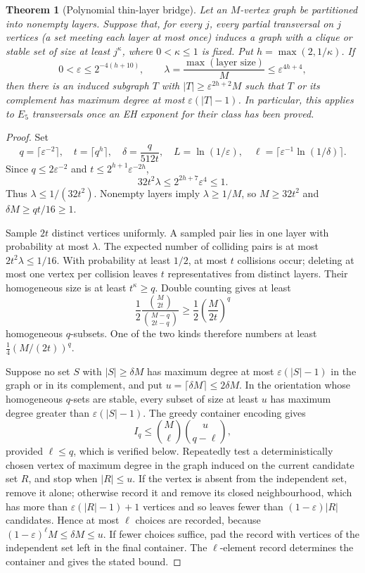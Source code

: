 \documentclass[11pt,a4paper]{article}
\newtheorem{theorem}{Theorem}[section]
\theoremstyle{definition}
\theoremstyle{remark}
\numberwithin{equation}{section}
\begin{document}
\begin{theorem}[Polynomial thin-layer bridge]
Let an \(M\)-vertex graph be partitioned into nonempty layers. Suppose that, for every \(j\), every partial transversal on \(j\) vertices (a set meeting each layer at most once) induces a graph with a clique or stable set of size at least \(j^\kappa\), where \(0<\kappa\le1\) is fixed. Put \(h=\max(2,1/\kappa)\). If
\[
 0<\varepsilon\le2^{-4(h+10)},\qquad
 \lambda=\frac{\max(\text{layer size})}{M}\le\varepsilon^{4h+4},
\]
then there is an induced subgraph \(T\) with \(|T|\ge\varepsilon^{2h+2}M\) such that \(T\) or its complement has maximum degree at most \(\varepsilon(|T|-1)\). In particular, this applies to \(E_5\) transversals once an EH exponent for their class has been proved.
\end{theorem}
\begin{proof}
Set
\[
 q=\lceil\varepsilon^{-2}\rceil,\quad t=\lceil q^h\rceil,\quad
 \delta=\frac{q}{512t},\quad L=\ln(1/\varepsilon),\quad
 \ell=\lceil\varepsilon^{-1}\ln(1/\delta)\rceil.
\]
Since \(q\le2\varepsilon^{-2}\) and \(t\le2^{h+1}\varepsilon^{-2h}\),
\[
 32t^2\lambda\le2^{2h+7}\varepsilon^4\le1.
\]
Thus \(\lambda\le1/(32t^2)\). Nonempty layers imply \(\lambda\ge1/M\), so \(M\ge32t^2\) and \(\delta M\ge qt/16\ge1\).

Sample \(2t\) distinct vertices uniformly. A sampled pair lies in one layer with probability at most \(\lambda\). The expected number of colliding pairs is at most \(2t^2\lambda\le1/16\). With probability at least \(1/2\), at most \(t\) collisions occur; deleting at most one vertex per collision leaves \(t\) representatives from distinct layers. Their homogeneous size is at least \(t^\kappa\ge q\). Double counting gives at least
\[
 \frac12\frac{\binom{M}{2t}}{\binom{M-q}{2t-q}}
 \ge\frac12\left(\frac{M}{2t}\right)^q
\]
homogeneous \(q\)-subsets. One of the two kinds therefore numbers at least \(\tfrac14(M/(2t))^q\).

Suppose no set \(S\) with \(|S|\ge\delta M\) has maximum degree at most \(\varepsilon(|S|-1)\) in the graph or in its complement, and put \(u=\lceil\delta M\rceil\le2\delta M\). In the orientation whose homogeneous \(q\)-sets are stable, every subset of size at least \(u\) has maximum degree greater than \(\varepsilon(|S|-1)\). The greedy container encoding gives
\[
 I_q\le\binom{M}{\ell}\binom{u}{q-\ell},
\]
provided \(\ell\le q\), which is verified below. Repeatedly test a deterministically chosen vertex of maximum degree in the graph induced on the current candidate set \(R\), and stop when \(|R|\le u\). If the vertex is absent from the independent set, remove it alone; otherwise record it and remove its closed neighbourhood, which has more than \(\varepsilon(|R|-1)+1\) vertices and so leaves fewer than \((1-\varepsilon)|R|\) candidates. Hence at most \(\ell\) choices are recorded, because \((1-\varepsilon)^\ell M\le\delta M\le u\). If fewer choices suffice, pad the record with vertices of the independent set left in the final container. The \(\ell\)-element record determines the container and gives the stated bound.


\end{proof}
\end{document}
